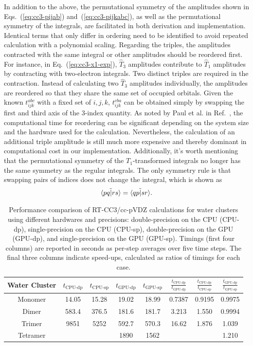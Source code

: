 In addition to the above, the permutational symmetry of the amplitudes shown in Eqs.~(\ref{eq:cc3-pijab}) and~(\ref{eq:cc3-pijkabc}), as well as the permutational symmetry of the integrals, are facilitated in both derivation and implementation. Identical terms that only differ in ordering need to be identified to avoid repeated calculation with a polynomial scaling. Regarding the triples, the amplitudes contracted with the same integral or other amplitudes should be reordered first. For instance, in Eq.~(\ref{eq:cc3-x1-exp}), $\hat{T}_{3}$ amplitudes contribute to $\hat{T}_{1}$ amplitudes by contracting with two-electron integrals. Two distinct triples are required in the contraction. Instead of calculating two $\hat{T}_{3}$ amplitudes individually, the amplitudes are reordered so that they share the same set of occupied orbitals. Given the known $t_{ijk}^{abc}$ with a fixed set of $i,j,k$, $t_{ijk}^{cba}$ can be obtained simply by swapping the first and third axis of the 3-index quantity. As noted by Paul et al. in Ref.~, the computational time for reordering can be significant depending on the system size and the hardware used for the calculation. Nevertheless, the calculation of an additional triple amplitude is still much more expensive and thereby dominant in computational cost in our implementation. Additionally, it's worth mentioning that the permutational symmetry of the $T_{1}$-transformed integrals no longer has the same symmetry as the regular integrals. The only symmetry rule is that swapping pairs of indices does not change the integral, which is shown as
\begin{equation}
\tilde{\langle pq |rs \rangle} = \tilde{\langle qp |sr \rangle}.
\end{equation}
\begin{table} 
    \centering
        \caption{Performance comparison of RT-CC3/cc-pVDZ calculations for water clusters using different hardwares and precisions: double-precision on the CPU (CPU-dp), single-precision on the CPU (CPU-sp), double-precision on the GPU (GPU-dp), and single-precision on the GPU (GPU-sp). Timings (first four columns) are reported in seconds as per-step averages over five time steps. The final three columns indicate speed-ups, calculated as ratios of timings for each case.}
    \begin{tabular}{c|ccccccc}
       \textrm{Water Cluster} & $t_\textrm{CPU-dp}$ &  $t_\textrm{CPU-sp}$ & $t_\textrm{GPU-dp}$ &
$t_\textrm{GPU-sp}$ & $\frac{t_\textrm{CPU-dp}}{t_\textrm{GPU-dp}}$ & $\frac{t_\textrm{CPU-dp}}{t_\textrm{CPU-sp}}$ & 
$\frac{t_\textrm{GPU-dp}}{t_\textrm{GPU-sp}}$ \\ \hline
       \textrm{Monomer} & 14.05 & 15.28 & 19.02 & 18.99 & 0.7387 & 0.9195 & 0.9975 \\ 
       \textrm{Dimer} & 583.4 & 376.5 & 181.6 & 181.7 & 3.213 & 1.550 & 0.9994 \\
       \textrm{Trimer} & 9851 & 5252 & 592.7 & 570.3 & 16.62 & 1.876 & 1.039 \\
       \textrm{Tetramer} & & & 1890 & 1562 & & & 1.210
    \end{tabular}
    \label{tab:cc3-gpu-cpu}
\end{table}

